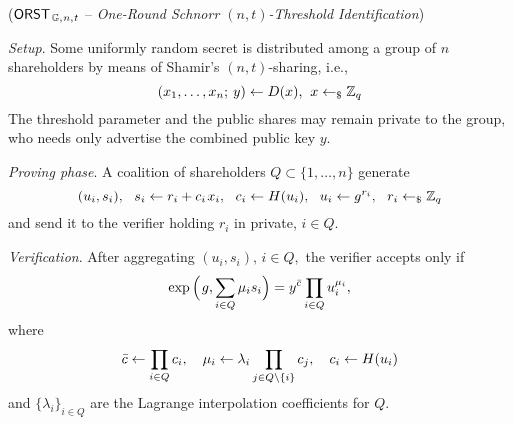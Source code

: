 \documentclass{iacrtrans}
\begin{document}
\begin{protocol}\label{orst_protocol}
($
\mathsf{ORST}
	_{\hspace{1pt}\mathbb{G},\hspace{0.5pt} n,\hspace{0.5pt} t}
$
-- \textit{One-Round Schnorr $(n, t)$-Threshold Identification})
\enumerate[label=$\circ$, leftmargin=17pt]
\vspace{2pt}
\item \textit{Setup}. Some uniformly random secret is
distributed among a group of $n$ shareholders
by means of Shamir's $(n, t)$-sharing, i.e.,
\vspace{5pt}
\begin{equation*}\label{orst_sharing}
(x_1, \dots, x_n;\hspace{2pt} y) \leftarrow D(x),
\hspace{4pt} x \leftarrow_\$ \mathbb{Z}_q
\vspace{5pt}
\end{equation*}
The threshold parameter and the public shares may remain private to the group,
who needs only advertise the combined public key $y$.
\vspace{5pt}
\item \textit{Proving phase}. A coalition of shareholders
$Q \subset \{1, \dots, n\}$ generate
\vspace{5pt}
\begin{equation*}
(u_i, s_i),
\ \ s_i \leftarrow r_i + c_i\hspace{1pt} x_i,
\ \ c_i \leftarrow H(u_i),
\ \ u_i \leftarrow g ^ {r_i},
\ \ r_i \leftarrow_\$ \mathbb{Z}_q
\vspace{5pt}
\end{equation*}
and send it to the verifier holding $r_i$ in private, $i \in Q$.
\vspace{5pt}
\item \textit{Verification}.
After aggregating $(u_i, s_i),\hspace{2pt} i \in Q,$
the verifier accepts only if
\vspace{6pt}
\begin{equation}\label{orst_verification_0}
\exp\Big(\hspace{1pt}g, \sum_{i \in Q} \mu_i s_i\Big) =
y^{\bar{c}} \prod_{i \in Q} u_i ^ {\mu_i},
\vspace{-3pt}
\end{equation}
where
\vspace{2pt}
\begin{equation}\label{orst_aliases}
\bar{c} \leftarrow \prod_{i \in Q} c_i,
\ \ \  \mu_i \leftarrow \lambda_i \prod_{j \in Q \setminus \{i\}} c_j,
\ \ \  c_i \leftarrow H(u_i)
\vspace{8pt}
\end{equation}
and $\{\lambda_i\}_{i \in Q }$ are the
Lagrange interpolation coefficients for $Q$.
\vspace{5pt}
\end{protocol}
\end{document}
